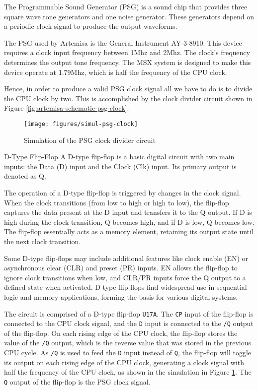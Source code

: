 The Programmable Sound Generator (PSG) is a sound chip that provides three square wave tone generators and one noise generator. These generators depend on a periodic clock signal to produce the output waveforms. 

The PSG used by Artemisa is the General Instrument AY-3-8910. This device requires a clock input frequency between 1Mhz and 2Mhz. The clock's frequency determines the output tone frequency. The MSX system is designed to make this device operate at 1.79Mhz, which is half the frequency of the CPU clock.

Hence, in order to produce a valid PSG clock signal all we have to do is to divide the CPU clock by two. This is accomplished by the clock divider circuit shown in Figure \ref{fig:artemisa-schematic-psg-clock}.

\begin{figure}[h]
  \centering
  \texttt{[image: figures/simul-psg-clock]}
  \caption{Simulation of the PSG clock divider circuit}
  \label{fig:simul-psg-clock}
\end{figure}

\begin{theory}{D-Type Flip-Flop}
  A D-type flip-flop is a basic digital circuit with two main inputs: the Data (D) input and the Clock (Clk) input. Its primary output is denoted as Q.
  
  The operation of a D-type flip-flop is triggered by changes in the clock signal. When the clock transitions (from low to high or high to low), the flip-flop captures the data present at the D input and transfers it to the Q output. If D is high during the clock transition, Q becomes high, and if D is low, Q becomes low. The flip-flop essentially acts as a memory element, retaining its output state until the next clock transition. 
  
  Some D-type flip-flops may include additional features like clock enable (EN) or asynchronous clear (CLR) and preset (PR) inputs. EN allows the flip-flop to ignore clock transitions when low, and CLR/PR inputs force the Q output to a defined state when activated. D-type flip-flops find widespread use in sequential logic and memory applications, forming the basis for various digital systems.  
\end{theory}

The circuit is comprised of a D-type flip-flop {\tt U17A}. The {\tt CP} input of the flip-flop is connected to the CPU clock signal, and the {\tt D} input is connected to the {\tt /Q} output of the flip-flop. On each rising edge of the CPU clock, the flip-flop stores the value of the {\tt /Q} output, which is the reverse value that was stored in the previous CPU cycle. As {\tt /Q} is used to feed the {\tt D} input instead of {\tt Q}, the flip-flop will toggle its output on each rising edge of the CPU clock, generating a clock signal with half the frequency of the CPU clock, as shown in the simulation in Figure \ref{fig:simul-psg-clock}. The {\tt Q} output of the flip-flop is the PSG clock signal.

